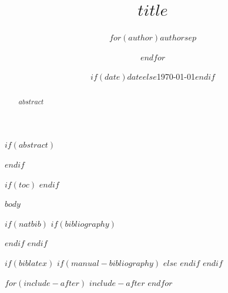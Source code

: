 \documentclass[$if(fontsize)$$fontsize$$else$11pt$endif$$for(classoption)$,$classoption$$endfor$]{$if(documentclass)$$documentclass$$else$article$endif$}
\title{$title$}
\author{$for(author)$$author$$sep$ \and $endfor$}
\date{$if(date)$$date$$else$\today$endif$}
\begin{document}
\maketitle

$if(abstract)$
\begin{abstract}
$abstract$
\end{abstract}
$endif$

$if(toc)$
\tableofcontents
$endif$

$body$

$if(natbib)$
$if(bibliography)$


$endif$
$endif$

$if(biblatex)$
$if(manual-bibliography)$
$else$
\printbibliography[title={References}]
$endif$
$endif$

$for(include-after)$
$include-after$
$endfor$
\end{document}
